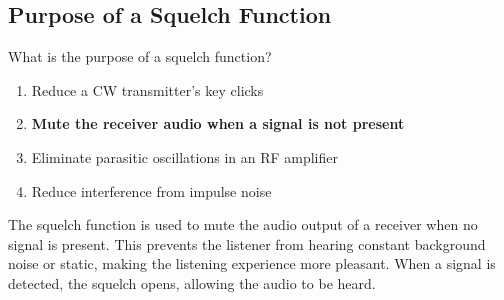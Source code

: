 \subsection{Purpose of a Squelch Function}
\label{T2B13}

\begin{tcolorbox}[colback=gray!10!white,colframe=black!75!black,title=T2B13]
What is the purpose of a squelch function?
\begin{enumerate}[noitemsep]
    \item Reduce a CW transmitter's key clicks
    \item \textbf{Mute the receiver audio when a signal is not present}
    \item Eliminate parasitic oscillations in an RF amplifier
    \item Reduce interference from impulse noise
\end{enumerate}
\end{tcolorbox}

The squelch function is used to mute the audio output of a receiver when no signal is present. This prevents the listener from hearing constant background noise or static, making the listening experience more pleasant. When a signal is detected, the squelch opens, allowing the audio to be heard.
